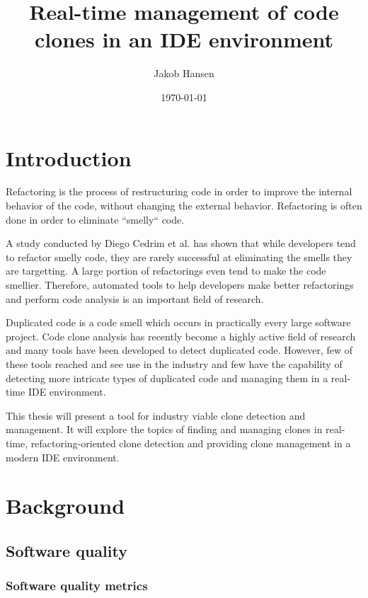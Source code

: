 \documentclass[12pt]{article}
\title{\vspace{-20px}Real-time management of code clones in an IDE environment}
\author{Jakob Hansen}
\date{\today}
\begin{document}
\maketitle

\tableofcontents

\section{Introduction}

Refactoring is the process of restructuring code in order to improve the internal behavior
of the code, without changing the external behavior.\cite[9]{fowlerrefactoring} Refactoring
is often done in order to eliminate ``smelly`` code.

A study conducted by Diego Cedrim et al.\cite{Rohit_Gheyi_Impact} has shown that while
developers tend to refactor smelly code, they are rarely successful at eliminating the
smells they are targetting. A large portion of refactorings even tend to make the code
smellier. Therefore, automated tools to help developers make better refactorings and
perform code analysis is an important field of research.

Duplicated code is a code smell which occurs in practically every large software project.
Code clone analysis has recently become a highly active field of research and many tools have
been developed to detect duplicated code.\cite[7]{Inoue_introduction_to_cc} However, few of
these tools reached and see use in the industry and few have the capability of detecting
more intricate types of duplicated code and managing them in a real-time IDE environment. 

This thesis will present a tool for industry viable clone detection and management. It
will explore the topics of finding and managing clones in real-time, refactoring-oriented
clone detection and providing clone management in a modern IDE environment.

\section{Background}

\subsection{Software quality}

\subsubsection{Software quality metrics}
\end{document}
